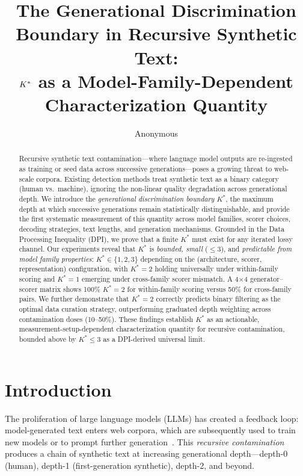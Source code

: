 \documentclass[11pt,a4paper]{article}
\title{The Generational Discrimination Boundary in Recursive Synthetic Text:\\
$\kstar$ as a Model-Family-Dependent Characterization Quantity}
\author{Anonymous}
\newcommand{\kstar}{K^{*}}
\begin{document}
\maketitle

\begin{abstract}
Recursive synthetic text contamination---where language model outputs are re-ingested as training or seed data across successive generations---poses a growing threat to web-scale corpora.
Existing detection methods treat synthetic text as a binary category (human vs.\ machine), ignoring the non-linear quality degradation across generational depth.
We introduce the \emph{generational discrimination boundary} $\kstar$, the maximum depth at which successive generations remain statistically distinguishable, and provide the first systematic measurement of this quantity across model families, scorer choices, decoding strategies, text lengths, and generation mechanisms.
Grounded in the Data Processing Inequality (DPI), we prove that a finite $\kstar$ must exist for any iterated lossy channel.
Our experiments reveal that $\kstar$ is \emph{bounded, small} ($\leq 3$), and \emph{predictable from model family properties}: $\kstar \in \{1, 2, 3\}$ depending on the (architecture, scorer, representation) configuration, with $\kstar = 2$ holding universally under within-family scoring and $\kstar = 1$ emerging under cross-family scorer mismatch.
A 4$\times$4 generator--scorer matrix shows 100\% $\kstar = 2$ for within-family scoring versus 50\% for cross-family pairs.
We further demonstrate that $\kstar = 2$ correctly predicts binary filtering as the optimal data curation strategy, outperforming graduated depth weighting across contamination doses (10--50\%).
These findings establish $\kstar$ as an actionable, measurement-setup-dependent characterization quantity for recursive contamination, bounded above by $\kstar \leq 3$ as a DPI-derived universal limit.
\end{abstract}

\section{Introduction}
\label{sec:intro}

The proliferation of large language models (LLMs) has created a feedback loop: model-generated text enters web corpora, which are subsequently used to train new models or to prompt further generation~\cite{shumailov2024model}.
This \emph{recursive contamination} produces a chain of synthetic text at increasing generational depth---depth-0 (human), depth-1 (first-generation synthetic), depth-2, and beyond.
\end{document}
